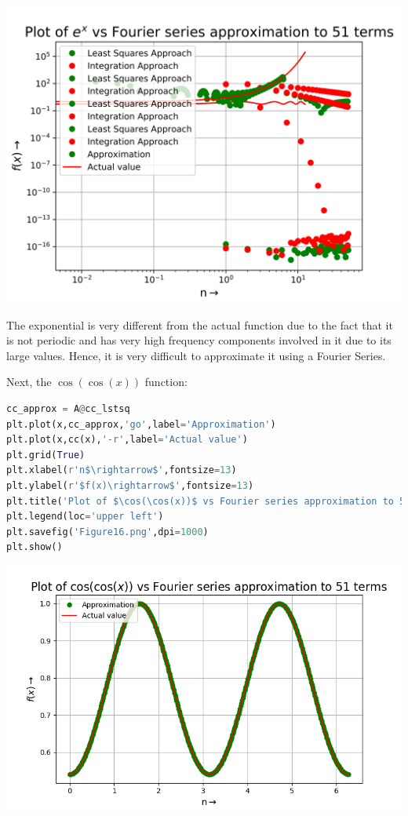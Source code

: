 \documentclass[12pt]{article}
\begin{document}
\begin{center}
    \includegraphics[scale=0.8]{images/Figure15.png}
\end{center}

The exponential is very different from the actual function due to the fact that it is not periodic and has very high frequency components involved in it due to its large values. Hence, it is very difficult to approximate it using a Fourier Series.

\pagebreak

Next, the $\cos(\cos(x))$ function:

\begin{lstlisting}[language=Python]
cc_approx = A@cc_lstsq
plt.plot(x,cc_approx,'go',label='Approximation')
plt.plot(x,cc(x),'-r',label='Actual value')
plt.grid(True)
plt.xlabel(r'n$\rightarrow$',fontsize=13)
plt.ylabel(r'$f(x)\rightarrow$',fontsize=13)
plt.title('Plot of $\cos(\cos(x))$ vs Fourier series approximation to 51 terms',fontsize=16)
plt.legend(loc='upper left')
plt.savefig('Figure16.png',dpi=1000)
plt.show()
\end{lstlisting}

\begin{center}
    \includegraphics[scale=0.8]{images/Figure17.png}
\end{center}
\end{document}
